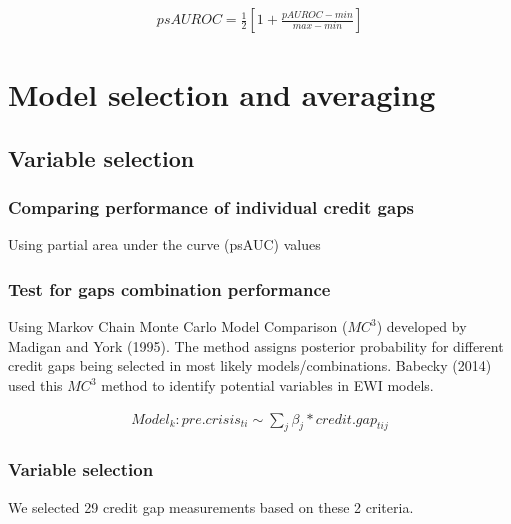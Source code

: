 \documentclass[
  12pt,
]{article}
\begin{document}
\begin{align}
psAUROC = \frac{1}{2}\left[ 1+ \frac{pAUROC - min}{max - min}\right]
\end{align}

\hypertarget{model-selection-and-averaging}{%
\section{Model selection and averaging}\label{model-selection-and-averaging}}

\hypertarget{variable-selection}{%
\subsection{Variable selection}\label{variable-selection}}

\hypertarget{comparing-performance-of-individual-credit-gaps}{%
\subsubsection{Comparing performance of individual credit gaps}\label{comparing-performance-of-individual-credit-gaps}}

Using partial area under the curve (psAUC) values

\hypertarget{test-for-gaps-combination-performance}{%
\subsubsection{Test for gaps combination performance}\label{test-for-gaps-combination-performance}}

Using Markov Chain Monte Carlo Model Comparison (\(MC^3\)) developed by Madigan and York (1995). The method assigns posterior probability for different credit gaps being selected in most likely models/combinations. Babecky (2014) used this \(MC^3\) method to identify potential variables in EWI models.

\begin{align*}
Model_k :  pre.crisis_{ti} \sim \sum\nolimits_j \beta_j * credit.gap_{tij}
\end{align*}

\hypertarget{variable-selection-1}{%
\subsubsection{Variable selection}\label{variable-selection-1}}

We selected 29 credit gap measurements based on these 2 criteria.
\end{document}
